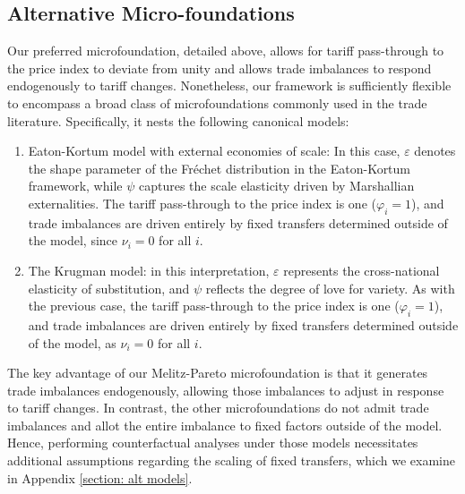 \documentclass[12pt]{article}
\begin{document}
\subsection{Alternative Micro-foundations}
Our preferred microfoundation, detailed above, allows for tariff pass-through to the price index to deviate from unity and allows trade imbalances to respond endogenously to tariff changes. Nonetheless, our framework is sufficiently flexible to encompass a broad class of microfoundations commonly used in the trade literature. Specifically, it nests the following canonical models:
\begin{enumerate}
    \item Eaton-Kortum model with external economies of scale: In this case, $\varepsilon$ denotes the shape parameter of the Fr\'echet distribution in the Eaton-Kortum framework, while $\psi$ captures the scale elasticity driven by Marshallian externalities. The tariff pass-through to the price index is one ($\varphi_i = 1$), and trade imbalances are driven entirely by fixed transfers determined outside of the model, since $\nu_i = 0$ for all $i$.

    \item The Krugman model: in this interpretation, $\varepsilon$ represents the cross-national elasticity of substitution, and $\psi$ reflects the degree of love for variety. As with the previous case, the tariff pass-through to the price index is one ($\varphi_i = 1$), and trade imbalances are driven entirely by fixed transfers determined outside of the model, as $\nu_i = 0$ for all $i$.
\end{enumerate}
The key advantage of our Melitz-Pareto microfoundation is that it generates trade imbalances endogenously, allowing those imbalances to adjust in response to tariff changes. In contrast, the other microfoundations do not admit trade imbalances and allot the entire imbalance to fixed factors outside of the model. Hence, performing counterfactual analyses under those models necessitates additional assumptions regarding the scaling of fixed transfers, which we examine in Appendix  \ref{section: alt models}.

 
\end{document}
